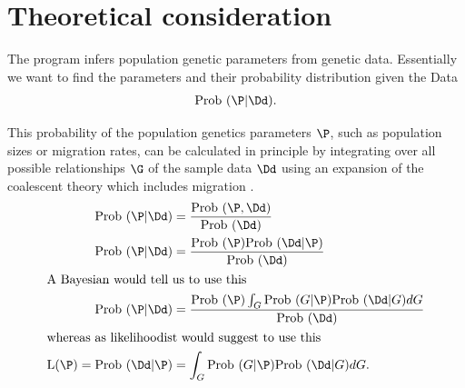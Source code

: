 \def \M{\mathcal{M}}
\newcommand{\prob}{{\rm Prob~}}
\chapter{Theoretical consideration}
The program \migrate infers population genetic parameters from genetic data. Essentially we want to find the parameters and their probability distribution given the Data
\begin{align}
   \prob(\P | \Dd). \notag
\end{align} 

This probability of the population genetics parameters $\P$, 
such as population sizes or migration rates, can be calculated in principle by integrating over all possible 
relationships 
$\G$ 
of the sample data 
$\Dd$ 
using   an expansion of the coalescent theory \citep{kingman1982-27,kingman1982-235,kingman2000-1461} which
includes migration \citep{hudson1991-1,nath1993-841,notohara1990-59}.
\begin{align}
\prob(\P | \Dd) &=  \frac{\prob( \P, \Dd)}{\prob(\Dd)} \\
\prob(\P | \Dd) &=  \frac{\prob(\P) \prob( \Dd | \P)}{\prob(\Dd)}\\
\intertext{A Bayesian would tell us to use this}
\label{BAYES}
\prob(\P | \Dd) &=  \frac{\prob(\P) \int_G \prob(G | \P) \prob( \Dd | G)dG}{\prob(\Dd)}  \\ 
\intertext{whereas as likelihoodist would suggest to use this}
\label{LIKELIHOOD}  
{\rm L}(\P) = \prob(\Dd | \P) &=   \int_G \prob(G | \P) \prob( \Dd | G)dG.   
\end{align}
 
